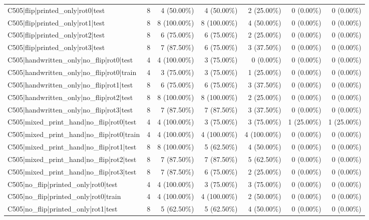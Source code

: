 \begin{longtable}{>{\raggedright\arraybackslash}p{5cm}rrrrrr}
C505|flip|printed\_only|rot0|test & 8 & 4 (50.00\%) & 4 (50.00\%) & 2 (25.00\%) & 0 (0.00\%) & 0 (0.00\%) \\
C505|flip|printed\_only|rot1|test & 8 & 8 (100.00\%) & 8 (100.00\%) & 4 (50.00\%) & 0 (0.00\%) & 0 (0.00\%) \\
C505|flip|printed\_only|rot2|test & 8 & 6 (75.00\%) & 6 (75.00\%) & 2 (25.00\%) & 0 (0.00\%) & 0 (0.00\%) \\
C505|flip|printed\_only|rot3|test & 8 & 7 (87.50\%) & 6 (75.00\%) & 3 (37.50\%) & 0 (0.00\%) & 0 (0.00\%) \\
C505|handwritten\_only|no\_flip|rot0|test & 4 & 4 (100.00\%) & 3 (75.00\%) & 0 (0.00\%) & 0 (0.00\%) & 0 (0.00\%) \\
C505|handwritten\_only|no\_flip|rot0|train & 4 & 3 (75.00\%) & 3 (75.00\%) & 1 (25.00\%) & 0 (0.00\%) & 0 (0.00\%) \\
C505|handwritten\_only|no\_flip|rot1|test & 8 & 6 (75.00\%) & 6 (75.00\%) & 3 (37.50\%) & 0 (0.00\%) & 0 (0.00\%) \\
C505|handwritten\_only|no\_flip|rot2|test & 8 & 8 (100.00\%) & 8 (100.00\%) & 2 (25.00\%) & 0 (0.00\%) & 0 (0.00\%) \\
C505|handwritten\_only|no\_flip|rot3|test & 8 & 7 (87.50\%) & 7 (87.50\%) & 3 (37.50\%) & 0 (0.00\%) & 0 (0.00\%) \\
C505|mixed\_print\_hand|no\_flip|rot0|test & 4 & 4 (100.00\%) & 3 (75.00\%) & 3 (75.00\%) & 1 (25.00\%) & 1 (25.00\%) \\
C505|mixed\_print\_hand|no\_flip|rot0|train & 4 & 4 (100.00\%) & 4 (100.00\%) & 4 (100.00\%) & 0 (0.00\%) & 0 (0.00\%) \\
C505|mixed\_print\_hand|no\_flip|rot1|test & 8 & 8 (100.00\%) & 5 (62.50\%) & 4 (50.00\%) & 0 (0.00\%) & 0 (0.00\%) \\
C505|mixed\_print\_hand|no\_flip|rot2|test & 8 & 7 (87.50\%) & 7 (87.50\%) & 5 (62.50\%) & 0 (0.00\%) & 0 (0.00\%) \\
C505|mixed\_print\_hand|no\_flip|rot3|test & 8 & 7 (87.50\%) & 6 (75.00\%) & 2 (25.00\%) & 0 (0.00\%) & 0 (0.00\%) \\
C505|no\_flip|printed\_only|rot0|test & 4 & 4 (100.00\%) & 3 (75.00\%) & 3 (75.00\%) & 0 (0.00\%) & 0 (0.00\%) \\
C505|no\_flip|printed\_only|rot0|train & 4 & 4 (100.00\%) & 4 (100.00\%) & 2 (50.00\%) & 0 (0.00\%) & 0 (0.00\%) \\
C505|no\_flip|printed\_only|rot1|test & 8 & 5 (62.50\%) & 5 (62.50\%) & 4 (50.00\%) & 0 (0.00\%) & 0 (0.00\%) \\

\end{longtable}
